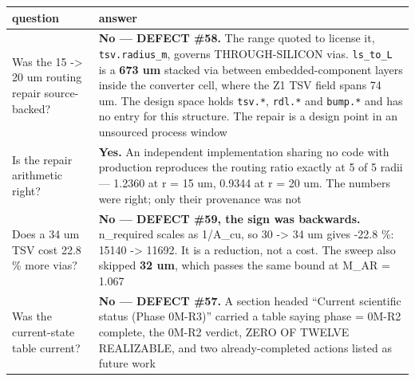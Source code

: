 \documentclass[10pt,]{article}
\begin{document}
\begin{longtable}[]{@{}ll@{}}
\toprule
\begin{minipage}[b]{0.47\columnwidth}\raggedright
question\strut
\end{minipage} & \begin{minipage}[b]{0.47\columnwidth}\raggedright
answer\strut
\end{minipage}\tabularnewline
\midrule
\endhead
\begin{minipage}[t]{0.47\columnwidth}\raggedright
Was the 15 -\textgreater{} 20 um routing repair source-backed?\strut
\end{minipage} & \begin{minipage}[t]{0.47\columnwidth}\raggedright
\textbf{No --- DEFECT \#58.} The range quoted to license it,
\texttt{tsv.radius\_m}, governs THROUGH-SILICON vias. \texttt{ls\_to\_L}
is a \textbf{673 um} stacked via between embedded-component layers
inside the converter cell, where the Z1 TSV field spans 74 um. The
design space holds \texttt{tsv.*}, \texttt{rdl.*} and \texttt{bump.*}
and has no entry for this structure. The repair is a design point in an
unsourced process window\strut
\end{minipage}\tabularnewline
\begin{minipage}[t]{0.47\columnwidth}\raggedright
Is the repair arithmetic right?\strut
\end{minipage} & \begin{minipage}[t]{0.47\columnwidth}\raggedright
\textbf{Yes.} An independent implementation sharing no code with
production reproduces the routing ratio exactly at 5 of 5 radii ---
1.2360 at r = 15 um, 0.9344 at r = 20 um. The numbers were right; only
their provenance was not\strut
\end{minipage}\tabularnewline
\begin{minipage}[t]{0.47\columnwidth}\raggedright
Does a 34 um TSV cost 22.8 \% more vias?\strut
\end{minipage} & \begin{minipage}[t]{0.47\columnwidth}\raggedright
\textbf{No --- DEFECT \#59, the sign was backwards.} n\_required scales
as 1/A\_cu, so 30 -\textgreater{} 34 um gives -22.8 \%: 15140
-\textgreater{} 11692. It is a reduction, not a cost. The sweep also
skipped \textbf{32 um}, which passes the same bound at M\_AR =
1.067\strut
\end{minipage}\tabularnewline
\begin{minipage}[t]{0.47\columnwidth}\raggedright
Was the current-state table current?\strut
\end{minipage} & \begin{minipage}[t]{0.47\columnwidth}\raggedright
\textbf{No --- DEFECT \#57.} A section headed ``Current scientific
status (Phase 0M-R3)'' carried a table saying phase = 0M-R2 complete,
the 0M-R2 verdict, ZERO OF TWELVE REALIZABLE, and two already-completed
actions listed as future work\strut
\end{minipage}\tabularnewline
\bottomrule
\end{longtable}
\end{document}
